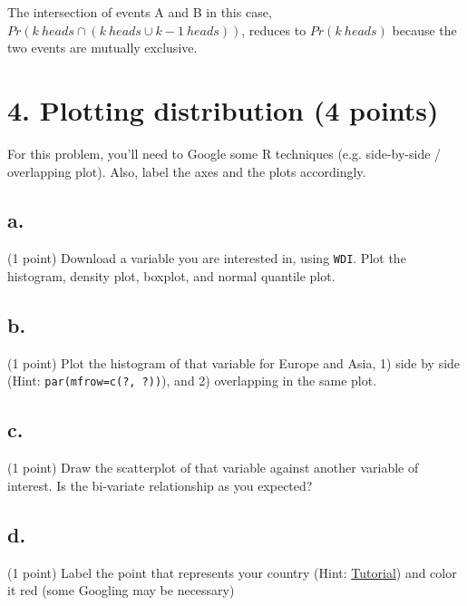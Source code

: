 \documentclass{article}\usepackage[]{graphicx}\usepackage[]{color}
\begin{document}
The intersection of events A and B in this case, $Pr (k\ heads \cap (k\ heads \cup k-1\ heads))$, reduces to $Pr(k\ heads)$ because the two events are mutually exclusive.

\section*{4. Plotting distribution (4 points)}

For this problem, you'll need to Google some R techniques (e.g. side-by-side / overlapping plot). Also, label the axes and the plots accordingly.

\subsection*{a.} (1 point) Download a variable you are interested in, using \verb`WDI`. Plot the histogram, density plot, boxplot, and normal quantile plot.

\subsection*{b.} (1 point) Plot the histogram of that variable for Europe and Asia, 1) side by side (Hint: \verb`par(mfrow=c(?, ?))`), and 2) overlapping in the same plot.

\subsection*{c.} (1 point) Draw the scatterplot of that variable against another variable of interest. Is the bi-variate relationship as you expected?

\subsection*{d.} (1 point) Label the point that represents your country (Hint: \href{https://chemicalstatistician.wordpress.com/2013/03/02/adding-labels-to-points-in-a-scatter-plot-in-r/}{Tutorial}) and color it red (some Googling may be necessary)
\end{document}
